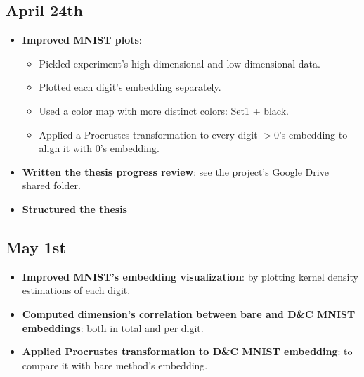 \documentclass[a4paper,12pt]{article}
\begin{document}
\subsection{April 24th}
\begin{itemize}
    \item \textbf{Improved MNIST plots}:
    
    \begin{itemize}
        \item Pickled experiment's high-dimensional and low-dimensional data.
        \item Plotted each digit's embedding separately.
        \item Used a color map with more distinct colors: Set1 + black.
        \item Applied a Procrustes transformation to every digit $> 0$'s embedding to align it with 0's embedding.
    \end{itemize}

    \item \textbf{Written the thesis progress review}: see the project's Google Drive shared folder.
    
    \item \textbf{Structured the thesis}
    
\end{itemize}

\subsection{May 1st}
\begin{itemize}
    \item \textbf{Improved MNIST's embedding visualization}: by plotting kernel density estimations of each digit.
    \item \textbf{Computed dimension's correlation between bare and D\&C MNIST embeddings}: both in total and per digit.
    \item \textbf{Applied Procrustes transformation to D\&C MNIST embedding}: to compare it with bare method's embedding.
\end{itemize}
\end{document}
